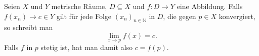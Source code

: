 Seien $X$ und $Y$ metrische Räume, $D \subseteq X$ und $f: D \to Y$ eine Abbildung. Falls $f(x_n) \to c \in Y$ gilt für jede Folge $(x_n)_{n \in \mathbb{N}}$ in $D$, die gegen $p \in X$ konvergiert, so schreibt man
$$\lim_{x \to p} f(x) = c.$$
Falls $f$ in $p$ stetig ist, hat man damit also $c = f(p)$.
